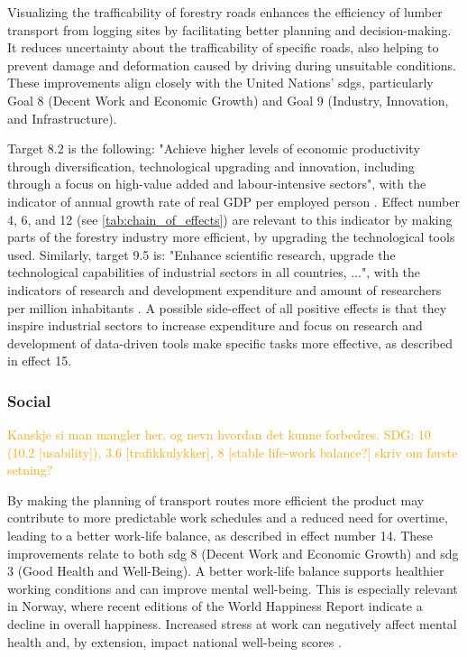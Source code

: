Visualizing the trafficability of forestry roads enhances the efficiency of lumber transport from logging sites by facilitating better planning and decision-making. It reduces uncertainty about the trafficability of specific roads, also helping to prevent damage and deformation caused by driving during unsuitable conditions. These improvements align closely with the United Nations' \acrshort{sdg}s, particularly Goal 8 (Decent Work and Economic Growth) and Goal 9 (Industry, Innovation, and Infrastructure). 

Target 8.2 is the following: "Achieve higher levels of economic productivity through diversification, technological upgrading and innovation, including through a focus on high-value added and labour-intensive sectors", with the indicator of annual growth rate of real GDP per employed person \cite{sdgsgoals}. Effect number 4, 6, and 12 (see \autoref{tab:chain_of_effects}) are relevant to this indicator by making parts of the forestry industry more efficient, by upgrading the technological tools used. Similarly, target 9.5 is: "Enhance scientific research, upgrade the technological capabilities of industrial sectors in all countries, ...", with the indicators of research and development expenditure and amount of researchers per million inhabitants \cite{sdgsgoals}. A possible side-effect of all positive effects is that they inspire industrial sectors to increase expenditure and focus on research and development of data-driven tools make specific tasks more effective, as described in effect 15.

\subsubsection{Social}

\textcolor{orange}{Kanskje si man mangler her, og nevn hvordan det kunne forbedres. SDG: 10 (10.2 [usability]), 3.6 [trafikkulykker], 8 [stable life-work balance?] skriv om første setning?}

By making the planning of transport routes more efficient the product may contribute to more predictable work schedules and a reduced need for overtime, leading to a better work-life balance, as described in effect number 14. These improvements relate to both \acrshort{sdg} 8 (Decent Work and Economic Growth) and \acrshort{sdg} 3 (Good Health and Well-Being). A better work-life balance supports healthier working conditions and can improve mental well-being. This is especially relevant in Norway, where recent editions of the World Happiness Report indicate a decline in overall happiness. Increased stress at work can negatively affect mental health and, by extension, impact national well-being scores \cite{sdg3no}.

